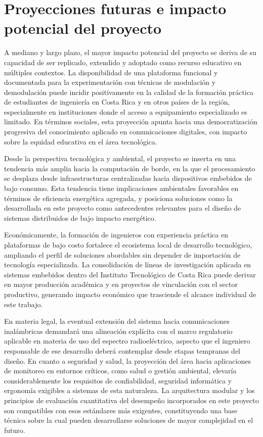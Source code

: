 \section{Proyecciones futuras e impacto potencial del proyecto}

A mediano y largo plazo, el mayor impacto potencial del proyecto se
deriva de su capacidad de ser replicado, extendido y adoptado como
recurso educativo en múltiples contextos. La disponibilidad de una
plataforma funcional y documentada para la experimentación con técnicas
de modulación y demodulación puede incidir positivamente en la calidad
de la formación práctica de estudiantes de ingeniería en Costa Rica y
en otros países de la región, especialmente en instituciones donde el
acceso a equipamiento especializado es limitado. En términos sociales,
esta proyección apunta hacia una democratización progresiva del
conocimiento aplicado en comunicaciones digitales, con impacto sobre
la equidad educativa en el área tecnológica.

Desde la perspectiva tecnológica y ambiental, el proyecto se inserta
en una tendencia más amplia hacia la computación de borde, en la que
el procesamiento se desplaza desde infraestructuras centralizadas hacia
dispositivos embebidos de bajo consumo. Esta tendencia tiene
implicaciones ambientales favorables en términos de eficiencia energética
agregada, y posiciona soluciones como la desarrollada en este proyecto
como antecedentes relevantes para el diseño de sistemas distribuidos
de bajo impacto energético.

Económicamente, la formación de ingenieros con experiencia práctica en
plataformas de bajo costo fortalece el ecosistema local de desarrollo
tecnológico, ampliando el perfil de soluciones abordables sin depender
de importación de tecnología especializada. La consolidación de líneas
de investigación aplicada en sistemas embebidos dentro del Instituto
Tecnológico de Costa Rica puede derivar en mayor producción académica
y en proyectos de vinculación con el sector productivo, generando
impacto económico que trasciende el alcance individual de este trabajo.

En materia legal, la eventual extensión del sistema hacia comunicaciones
inalámbricas demandará una alineación explícita con el marco regulatorio
aplicable en materia de uso del espectro radioeléctrico, aspecto que
el ingeniero responsable de ese desarrollo deberá contemplar desde
etapas tempranas del diseño. En cuanto a seguridad y salud, la proyección
del área hacia aplicaciones de monitoreo en entornos críticos, como
salud o gestión ambiental, elevaría considerablemente los requisitos
de confiabilidad, seguridad informática y ergonomía exigibles a sistemas
de esta naturaleza. La arquitectura modular y los principios de evaluación
cuantitativa del desempeño incorporados en este proyecto son compatibles
con esos estándares más exigentes, constituyendo una base técnica sobre
la cual pueden desarrollarse soluciones de mayor complejidad en el futuro.
